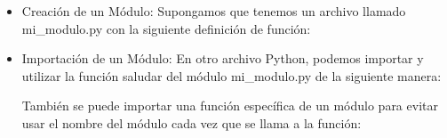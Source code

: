 \begin{itemize}
    \item Creación de un Módulo: Supongamos que tenemos un archivo llamado mi\_modulo.py con la siguiente definición de función:
    \begin{figure}[h]
        \centering
      \end{figure}
\newpage
    \item Importación de un Módulo: En otro archivo Python, podemos importar y utilizar la función saludar del módulo mi\_modulo.py de la siguiente manera:
    \begin{figure}[h]
        \centering
      \end{figure}
      
      También se puede importar una función específica de un módulo para evitar usar el nombre del módulo cada vez que se llama a la función:

      \begin{figure}[h]
        \centering
      \end{figure}
    \end{itemize}
      

